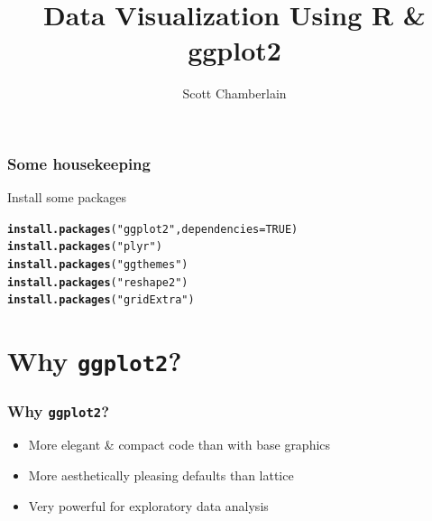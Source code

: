 \documentclass{beamer}\usepackage[]{graphicx}\usepackage[]{color}
\makeatletter
\newcommand{\hlnum}[1]{\textcolor[rgb]{0.686,0.059,0.569}{#1}}%
\newcommand{\hlstr}[1]{\textcolor[rgb]{0.192,0.494,0.8}{#1}}%
\newcommand{\hlstd}[1]{\textcolor[rgb]{0.345,0.345,0.345}{#1}}%
\newcommand{\hlkwc}[1]{\textcolor[rgb]{0.333,0.667,0.333}{#1}}%
\newcommand{\hlkwd}[1]{\textcolor[rgb]{0.737,0.353,0.396}{\textbf{#1}}}%
\newenvironment{kframe}{%
 \def\at@end@of@kframe{}%
 \ifinner\ifhmode%
  \def\at@end@of@kframe{\end{minipage}}%
  \begin{minipage}{\columnwidth}%
 \fi\fi%
 \def\FrameCommand##1{\hskip\@totalleftmargin \hskip-\fboxsep
 \colorbox{shadecolor}{##1}\hskip-\fboxsep
     \hskip-\linewidth \hskip-\@totalleftmargin \hskip\columnwidth}%
 \MakeFramed {\advance\hsize-\width
   \@totalleftmargin\z@ \linewidth\hsize
   \@setminipage}}%
 {\par\unskip\endMakeFramed%
 \at@end@of@kframe}
\newenvironment{knitrout}{}{} %
\makeatother
\begin{document}


\title{Data Visualization Using R \& ggplot2}
\author{Scott Chamberlain}
\maketitle


\begin{frame}[fragile]
\frametitle{Some housekeeping}
Install some packages
\begin{knitrout}\footnotesize
{}\color{fgcolor}\begin{kframe}
\begin{alltt}
\hlkwd{install.packages}\hlstd{(}\hlstr{"ggplot2"}\hlstd{,} \hlkwc{dependencies} \hlstd{=} \hlnum{TRUE}\hlstd{)}
\hlkwd{install.packages}\hlstd{(}\hlstr{"plyr"}\hlstd{)}
\hlkwd{install.packages}\hlstd{(}\hlstr{"ggthemes"}\hlstd{)}
\hlkwd{install.packages}\hlstd{(}\hlstr{"reshape2"}\hlstd{)}
\hlkwd{install.packages}\hlstd{(}\hlstr{"gridExtra"}\hlstd{)}
\end{alltt}
\end{kframe}
\end{knitrout}

\end{frame}


\section*{Why \texttt{ggplot2}?}
\frame{\sectionpage}


\begin{frame}[fragile]
\frametitle{Why \texttt{ggplot2}?}
\begin{itemize}
\item More elegant \& compact code than with base graphics\\
\item More aesthetically pleasing defaults than lattice\\
\item Very powerful for exploratory data analysis\\
\end{itemize}
\end{frame}
\end{document}
